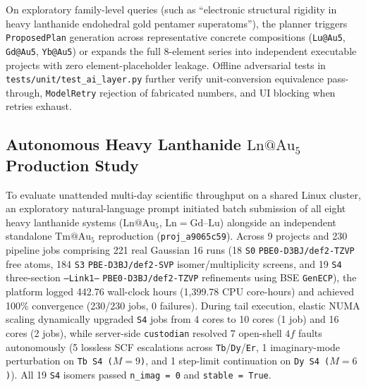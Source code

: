 \documentclass[journal=jcisd8,manuscript=article]{achemso}
\begin{document}
On exploratory family-level queries (such as ``electronic structural rigidity in heavy lanthanide endohedral gold pentamer superatoms''), the planner triggers \texttt{ProposedPlan} generation across representative concrete compositions (\texttt{Lu@Au5}, \texttt{Gd@Au5}, \texttt{Yb@Au5}) or expands the full 8-element series into independent executable projects with zero element-placeholder leakage. Offline adversarial tests in \texttt{tests/unit/test\_ai\_layer.py} further verify unit-conversion equivalence pass-through, \texttt{ModelRetry} rejection of fabricated numbers, and UI blocking when retries exhaust.

\subsection{Autonomous Heavy Lanthanide $\mathrm{Ln@Au_5}$ Production Study}

To evaluate unattended multi-day scientific throughput on a shared Linux cluster, an exploratory natural-language prompt initiated batch submission of all eight heavy lanthanide systems ($\mathrm{Ln@Au_5}$, $\mathrm{Ln} = \mathrm{Gd\text{--}Lu}$) alongside an independent standalone $\mathrm{Tm@Au_5}$ reproduction (\texttt{proj\_a9065c59}). Across 9 projects and 230 pipeline jobs comprising 221 real Gaussian 16 runs (18 \texttt{S0} \texttt{PBE0-D3BJ/def2-TZVP} free atoms, 184 \texttt{S3} \texttt{PBE-D3BJ/def2-SVP} isomer/multiplicity screens, and 19 \texttt{S4} three-section \texttt{--Link1--} \texttt{PBE0-D3BJ/def2-TZVP} refinements using BSE \texttt{GenECP}), the platform logged 442.76 wall-clock hours (1,399.78 CPU core-hours) and achieved 100\% convergence (230/230 jobs, 0 failures). During tail execution, elastic NUMA scaling dynamically upgraded \texttt{S4} jobs from 4 cores to 10 cores (1 job) and 16 cores (2 jobs), while server-side \texttt{custodian} resolved 7 open-shell $4f$ faults autonomously (5 lossless SCF escalations across \texttt{Tb}/\texttt{Dy}/\texttt{Er}, 1 imaginary-mode perturbation on \texttt{Tb S4 ($M=9$)}, and 1 step-limit continuation on \texttt{Dy S4 ($M=6$)}). All 19 \texttt{S4} isomers passed \texttt{n\_imag = 0} and \texttt{stable = True}.
\end{document}
